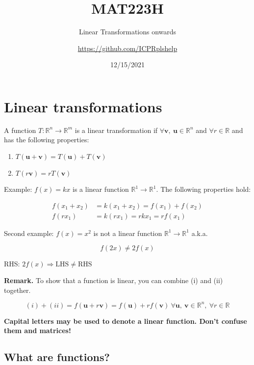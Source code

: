 \documentclass[
]{article}
\title{MAT223H}
\subtitle{Linear Transformations onwards}
\author{\url{https://github.com/ICPRplshelp}}
\date{12/15/2021}
\newcounter{example}
\begin{document}
\maketitle

{
\setcounter{tocdepth}{3}
\tableofcontents
}

\section{Linear transformations}

A function $T:\mathbb{R}^{n} \rightarrow \mathbb{R}^{m}$ is a linear
transformation if
$\forall\mathbf{v},\ \mathbf{u} \in \mathbb{R}^{n}$ and
$\forall r\mathbb{\in R}$ and has the following properties:

\begin{enumerate}
\def\labelenumi{(\roman{enumi})}
\item
  $T\left( \mathbf{u} + \mathbf{v} \right) = T\left( \mathbf{u} \right) + T(\mathbf{v})$
\item
  $T\left( r\mathbf{v} \right) = rT(\mathbf{v})$
\end{enumerate}

Example: $f(x) = kx$ is a linear function
$\mathbb{R}^{1} \rightarrow \mathbb{R}^{1}$. The following properties
hold:

\begin{align*}
f\left( x_{1} + x_{2} \right) &= k\left( x_{1} + x_{2} \right) = f\left( x_{1} \right) + f\left( x_{2} \right)
 \\
f\left( rx_{1} \right) &= k\left( rx_{1} \right) = rkx_{1} = rf(x_{1})
\end{align*}


Second example: $f(x) = x^{2}$ is not a linear function
$\mathbb{R}^{1} \rightarrow \mathbb{R}^{1}$ a.k.a.

$$f(2x) \neq 2f(x)
$$

RHS: $2f(x) \Rightarrow \text{LHS} \neq \text{RHS}$

\textbf{Remark.} To show that a function is linear, you can combine (i)
and (ii) together.

$$(i) + \left( ii \right) = f\left( \mathbf{u} + r\mathbf{v} \right) = f\left( \mathbf{u} \right) + rf\left( \mathbf{v} \right)\ \forall\mathbf{u},\ \mathbf{v} \in \mathbb{R}^{n},\ \forall r\mathbb{\in R}$$

\textbf{Capital letters may be used to denote a linear function. Don't
confuse them and matrices!}


\subsection{What are functions?}
\end{document}
